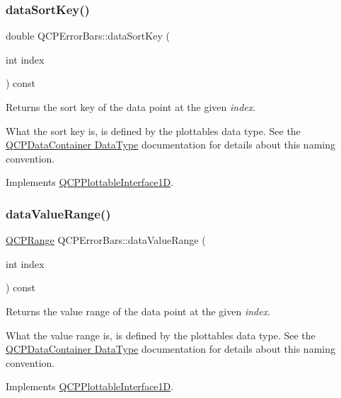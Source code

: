 \subsubsection{\texorpdfstring{data\+Sort\+Key()}{dataSortKey()}}
{\footnotesize\ttfamily double Q\+C\+P\+Error\+Bars\+::data\+Sort\+Key (\begin{DoxyParamCaption}\item[{int}]{index }\end{DoxyParamCaption}) const\hspace{0.3cm}{\ttfamily [virtual]}}

Returns the sort key of the data point at the given {\itshape index}.

What the sort key is, is defined by the plottable\textquotesingle{}s data type. See the \hyperlink{class_q_c_p_data_container_qcpdatacontainer-datatype}{Q\+C\+P\+Data\+Container Data\+Type} documentation for details about this naming convention. 

Implements \hyperlink{class_q_c_p_plottable_interface1_d_afdc92f9f01e7e35f2e96b2ea9dc14ae7}{Q\+C\+P\+Plottable\+Interface1D}.

\mbox{\label{class_q_c_p_error_bars_a09b99cf293b6041ae8d5c52cf8dd599c}} 
\subsubsection{\texorpdfstring{data\+Value\+Range()}{dataValueRange()}}
{\footnotesize\ttfamily \hyperlink{class_q_c_p_range}{Q\+C\+P\+Range} Q\+C\+P\+Error\+Bars\+::data\+Value\+Range (\begin{DoxyParamCaption}\item[{int}]{index }\end{DoxyParamCaption}) const\hspace{0.3cm}{\ttfamily [virtual]}}

Returns the value range of the data point at the given {\itshape index}.

What the value range is, is defined by the plottable\textquotesingle{}s data type. See the \hyperlink{class_q_c_p_data_container_qcpdatacontainer-datatype}{Q\+C\+P\+Data\+Container Data\+Type} documentation for details about this naming convention. 

Implements \hyperlink{class_q_c_p_plottable_interface1_d_a9ca7fcf14d885a200879768679b19be9}{Q\+C\+P\+Plottable\+Interface1D}.

